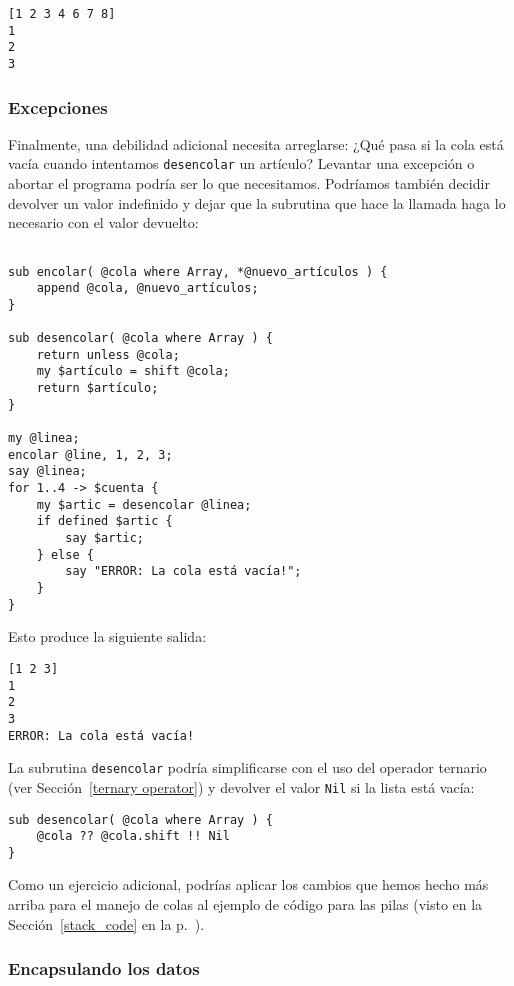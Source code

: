 \begin{verbatim}
[1 2 3 4 6 7 8]
1
2
3
\end{verbatim}

\subsubsection{Excepciones}

Finalmente, una debilidad adicional necesita arreglarse: 
¿Qué pasa si la cola está vacía cuando intentamos {\tt desencolar}
un artículo? Levantar una excepción o abortar el programa
podría ser lo que necesitamos. Podríamos también decidir
devolver un valor indefinido y dejar que la subrutina
que hace la llamada haga lo necesario con el valor devuelto:

\begin{verbatim}

sub encolar( @cola where Array, *@nuevo_artículos ) {
	append @cola, @nuevo_artículos;
}

sub desencolar( @cola where Array ) {
	return unless @cola;
	my $artículo = shift @cola;
	return $artículo;
}

my @linea;
encolar @line, 1, 2, 3;
say @linea;
for 1..4 -> $cuenta {
    my $artic = desencolar @linea;
    if defined $artic {
        say $artic;
    } else {
        say "ERROR: La cola está vacía!";
    }
}
\end{verbatim}

Esto produce la siguiente salida:

\begin{verbatim}
[1 2 3]
1
2
3
ERROR: La cola está vacía!
\end{verbatim}

La subrutina {\tt desencolar} podría simplificarse
con el uso del operador ternario (ver Sección~\ref{ternary operator}) 
y devolver el valor {\tt Nil} si la lista está vacía:

\begin{verbatim}
sub desencolar( @cola where Array ) {
    @cola ?? @cola.shift !! Nil
}
\end{verbatim}


Como un ejercicio adicional, podrías aplicar los cambios 
que hemos hecho más arriba para el manejo de colas al 
ejemplo de código para las pilas (visto en la Sección~\ref{stack_code} 
en la p.~\pageref{stack_code}).

\subsubsection{Encapsulando los datos}
\label{functional_queue}

